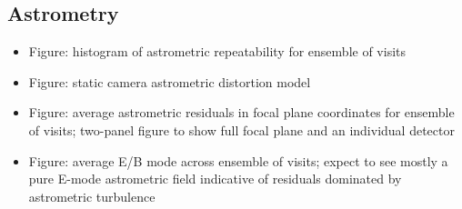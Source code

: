 \subsection{Astrometry}
\label{sec:astrometry}

\begin{itemize}
    \item Figure: histogram of astrometric repeatability for ensemble of visits
    \item Figure: static camera astrometric distortion model
    \item Figure: average astrometric residuals in focal plane coordinates for ensemble of visits; two-panel figure to show full focal plane and an individual detector
    \item Figure: average E/B mode across ensemble of visits; expect to see mostly a pure E-mode astrometric field indicative of residuals dominated by astrometric turbulence
\end{itemize}